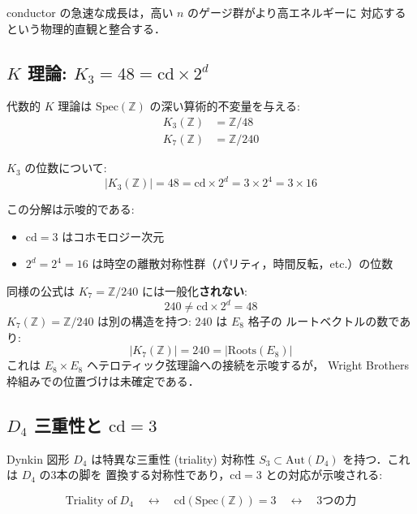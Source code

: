 conductor の急速な成長は，高い $n$ のゲージ群がより高エネルギーに
対応するという物理的直観と整合する．

\subsection{$K$ 理論: $K_3 = 48 = \mathrm{cd} \times 2^d$}

代数的 $K$ 理論は $\mathrm{Spec}(\mathbb{Z})$ の深い算術的不変量を与える:
\begin{align}
K_3(\mathbb{Z}) &= \mathbb{Z}/48 \\
K_7(\mathbb{Z}) &= \mathbb{Z}/240
\end{align}

$K_3$ の位数について:
\begin{equation}
|K_3(\mathbb{Z})| = 48 = \mathrm{cd} \times 2^d = 3 \times 2^4 = 3 \times 16
\end{equation}

この分解は示唆的である:
\begin{itemize}
\item $\mathrm{cd} = 3$ はコホモロジー次元
\item $2^d = 2^4 = 16$ は時空の離散対称性群（パリティ，時間反転，etc.）の位数
\end{itemize}

\begin{warningbox}[$K_7$ の問題]
同様の公式は $K_7 = \mathbb{Z}/240$ には一般化\textbf{されない}:
\begin{equation}
240 \neq \mathrm{cd} \times 2^d = 48
\end{equation}
$K_7(\mathbb{Z}) = \mathbb{Z}/240$ は別の構造を持つ: $240$ は $E_8$ 格子の
ルートベクトルの数であり:
\begin{equation}
|K_7(\mathbb{Z})| = 240 = |\text{Roots}(E_8)|
\end{equation}
これは $E_8 \times E_8$ ヘテロティック弦理論への接続を示唆するが，
Wright Brothers 枠組みでの位置づけは未確定である．
\end{warningbox}

\subsection{$D_4$ 三重性と $\mathrm{cd}=3$}

Dynkin 図形 $D_4$ は特異な三重性 (triality) 対称性
$S_3 \subset \mathrm{Aut}(D_4)$ を持つ．これは $D_4$ の3本の脚を
置換する対称性であり，$\mathrm{cd} = 3$ との対応が示唆される:

\begin{equation}
\text{Triality of}\;D_4
\quad\longleftrightarrow\quad
\mathrm{cd}(\mathrm{Spec}(\mathbb{Z})) = 3
\quad\longleftrightarrow\quad
\text{3つの力}
\end{equation}

